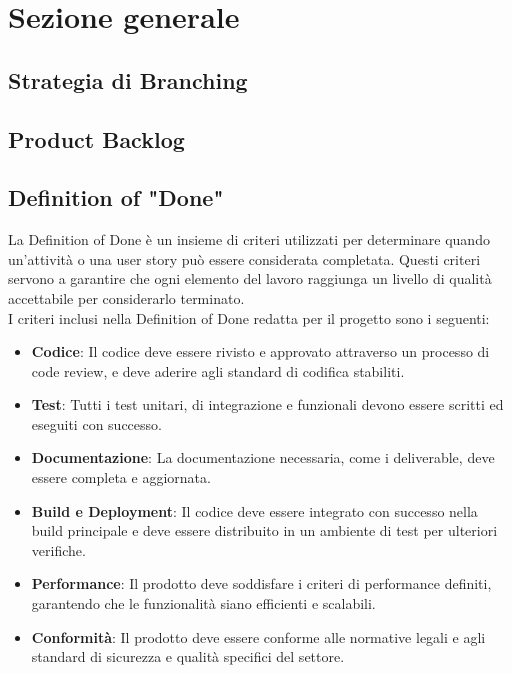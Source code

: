 \documentclass{article}
\begin{document}
\clearpage


\section{Sezione generale}

\subsection{Strategia di Branching}

\subsection{Product Backlog}

\subsection{Definition of "Done"}
La Definition of Done è un insieme di criteri utilizzati per determinare quando un'attività o una user story può essere considerata completata. Questi criteri servono a garantire che ogni elemento del lavoro raggiunga un livello di qualità accettabile per considerarlo terminato.\\
I criteri inclusi nella Definition of Done redatta per il progetto sono i seguenti:
\begin{itemize}
    \item \textbf{Codice}: Il codice deve essere rivisto e approvato attraverso un processo di code review, e deve aderire agli standard di codifica stabiliti.
    \item \textbf{Test}: Tutti i test unitari, di integrazione e funzionali devono essere scritti ed eseguiti con successo.
    \item \textbf{Documentazione}: La documentazione necessaria, come i deliverable, deve essere completa e aggiornata.
    \item \textbf{Build e Deployment}: Il codice deve essere integrato con successo nella build principale e deve essere distribuito in un ambiente di test per ulteriori verifiche.
    \item \textbf{Performance}: Il prodotto deve soddisfare i criteri di performance definiti, garantendo che le funzionalità siano efficienti e scalabili.
    \item \textbf{Conformità}: Il prodotto deve essere conforme alle normative legali e agli standard di sicurezza e qualità specifici del settore. 
\end{itemize}
\end{document}
